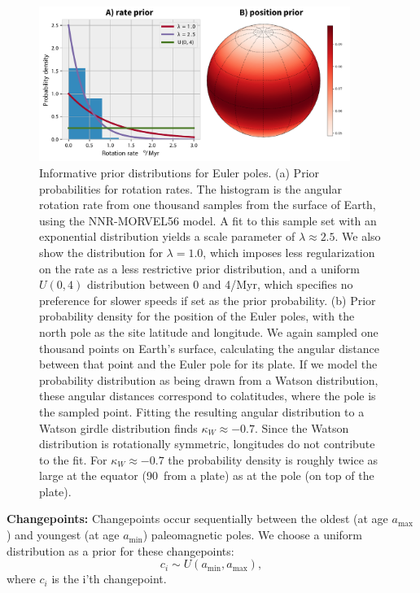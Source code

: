\documentclass[]{agujournal2019}
\begin{document}
\begin{figure}
\centering
\includegraphics[width=0.9\textwidth]{fig_euler_pole_prior.pdf}
\caption[Informative prior distributions for Euler poles]{Informative prior distributions for Euler poles. (a) Prior probabilities for rotation rates. The histogram is the angular rotation rate from one thousand samples from the surface of Earth, using the NNR-MORVEL56 model. A fit to this sample set with an exponential distribution yields a scale parameter of $\lambda \approx 2.5$. We also show the distribution for $\lambda = 1.0$, which imposes less regularization on the rate as a less restrictive prior distribution, and a uniform $U(0,4)$ distribution between 0 and 4\textdegree/Myr, which specifies no preference for slower speeds if set as the prior probability. (b) Prior probability density for the position of the Euler poles, with the north pole as the site latitude and longitude.  We again sampled one thousand points on Earth's surface, calculating the angular distance between that point and the Euler pole for its plate.  If we model the probability distribution as being drawn from a Watson distribution, these angular distances correspond to colatitudes, where the pole is the sampled point.  Fitting the resulting angular distribution to a Watson girdle distribution finds $\kappa_W\approx-0.7$. Since the Watson distribution is rotationally symmetric, longitudes do not contribute to the fit. For $\kappa_W\approx-0.7$ the probability density is roughly twice as large at the equator (90\textdegree\ from a plate) as at the pole (on top of the plate).}
\label{fig:euler_pole_prior}
\end{figure}

\textbf{Changepoints:} 
Changepoints occur sequentially between the oldest (at age $a_\mathrm{max}$) and youngest (at age $a_\mathrm{min}$) paleomagnetic poles. We choose a uniform distribution as a prior for these changepoints:
\begin{equation}
c_i \sim U( a_\mathrm{min}, a_\mathrm{max}),
\end{equation}
where $c_i$ is the i'th changepoint.
\end{document}

